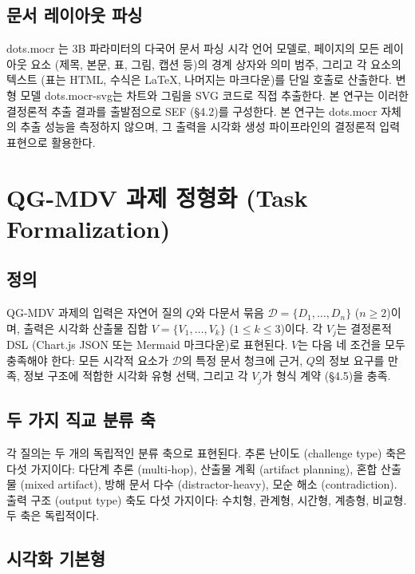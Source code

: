 \documentclass[11pt]{article}
\begin{document}
\subsection{문서 레이아웃 파싱}

dots.mocr \cite{zheng2026dotsmocr}는 3B 파라미터의 다국어 문서 파싱 시각 언어 모델로, 페이지의 모든 레이아웃 요소 (제목, 본문, 표, 그림, 캡션 등)의 경계 상자와 의미 범주, 그리고 각 요소의 텍스트 (표는 HTML, 수식은 LaTeX, 나머지는 마크다운)를 단일 호출로 산출한다. 변형 모델 dots.mocr-svg는 차트와 그림을 SVG 코드로 직접 추출한다. 본 연구는 이러한 결정론적 추출 결과를 출발점으로 SEF (\S 4.2)를 구성한다. 본 연구는 dots.mocr 자체의 추출 성능을 측정하지 않으며, 그 출력을 시각화 생성 파이프라인의 결정론적 입력 표현으로 활용한다.

\section{QG-MDV 과제 정형화 (Task Formalization)}

\subsection{정의}

QG-MDV 과제의 입력은 자연어 질의 $Q$와 다문서 묶음 $\mathcal{D} = \{D_1, \dots, D_n\}$ ($n \geq 2$)이며, 출력은 시각화 산출물 집합 $V = \{V_1, \dots, V_k\}$ ($1 \leq k \leq 3$)이다. 각 $V_j$는 결정론적 DSL (Chart.js JSON 또는 Mermaid 마크다운)로 표현된다. $V$는 다음 네 조건을 모두 충족해야 한다: 모든 시각적 요소가 $\mathcal{D}$의 특정 문서 청크에 근거, $Q$의 정보 요구를 만족, 정보 구조에 적합한 시각화 유형 선택, 그리고 각 $V_j$가 형식 계약 (\S 4.5)을 충족.

\subsection{두 가지 직교 분류 축}

각 질의는 두 개의 독립적인 분류 축으로 표현된다. 추론 난이도 (challenge type) 축은 다섯 가지이다: 다단계 추론 (multi-hop), 산출물 계획 (artifact planning), 혼합 산출물 (mixed artifact), 방해 문서 다수 (distractor-heavy), 모순 해소 (contradiction). 출력 구조 (output type) 축도 다섯 가지이다: 수치형, 관계형, 시간형, 계층형, 비교형. 두 축은 독립적이다.

\subsection{시각화 기본형}
\end{document}
